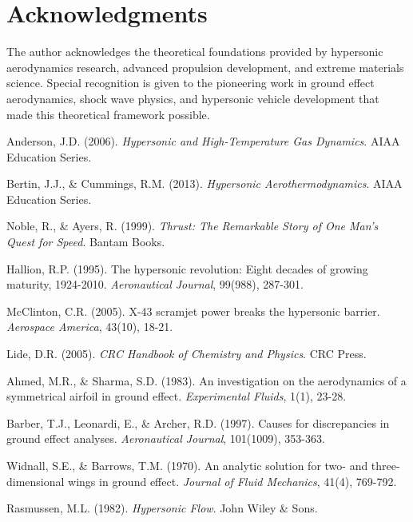 \documentclass[12pt,a4paper]{article}
\begin{document}
\section*{Acknowledgments}

The author acknowledges the theoretical foundations provided by hypersonic aerodynamics research, advanced propulsion development, and extreme materials science. Special recognition is given to the pioneering work in ground effect aerodynamics, shock wave physics, and hypersonic vehicle development that made this theoretical framework possible.


\begin{thebibliography}{99}

Anderson, J.D. (2006). \textit{Hypersonic and High-Temperature Gas Dynamics}. AIAA Education Series.

Bertin, J.J., \& Cummings, R.M. (2013). \textit{Hypersonic Aerothermodynamics}. AIAA Education Series.

Noble, R., \& Ayers, R. (1999). \textit{Thrust: The Remarkable Story of One Man's Quest for Speed}. Bantam Books.

Hallion, R.P. (1995). The hypersonic revolution: Eight decades of growing maturity, 1924-2010. \textit{Aeronautical Journal}, 99(988), 287-301.

McClinton, C.R. (2005). X-43 scramjet power breaks the hypersonic barrier. \textit{Aerospace America}, 43(10), 18-21.

Lide, D.R. (2005). \textit{CRC Handbook of Chemistry and Physics}. CRC Press.

Ahmed, M.R., \& Sharma, S.D. (1983). An investigation on the aerodynamics of a symmetrical airfoil in ground effect. \textit{Experimental Fluids}, 1(1), 23-28.

Barber, T.J., Leonardi, E., \& Archer, R.D. (1997). Causes for discrepancies in ground effect analyses. \textit{Aeronautical Journal}, 101(1009), 353-363.

Widnall, S.E., \& Barrows, T.M. (1970). An analytic solution for two- and three-dimensional wings in ground effect. \textit{Journal of Fluid Mechanics}, 41(4), 769-792.

Rasmussen, M.L. (1982). \textit{Hypersonic Flow}. John Wiley \& Sons.


\end{thebibliography}
\end{document}
